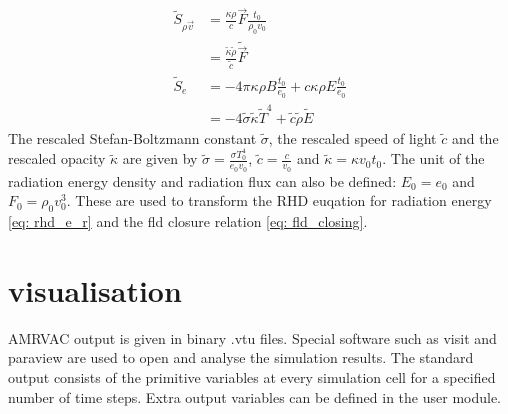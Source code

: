 \begin{align}
	\tilde{S}_{\rho \vec{v}} &=  \frac{\kappa \rho}{c} \vec{F} \frac{t_0}{\rho_0 v_0} \\
							 &=  \frac{\tilde{\kappa}\tilde{\rho}}{\tilde{c}} \tilde{\vec{F}} \\
	\tilde{S}_e &= -4\pi \kappa\rho B \frac{t_0}{e_0}  + c \kappa \rho E \frac{t_0}{e_0} \\
				&= -4 \tilde{\sigma} \tilde{\kappa} \tilde{T}^4 + \tilde{c} \tilde{\rho} \tilde{E}
\end{align}
The rescaled Stefan-Boltzmann constant $\tilde{\sigma}$, the rescaled speed of light $\tilde{c}$ and the rescaled opacity $\tilde{\kappa}$ are given by $\tilde{\sigma} = \frac{\sigma T_0^4}{e_0 v_0}$, $\tilde{c} = \frac{c}{v_0}$ and $\tilde{\kappa} = \kappa v_0 t_0$. The unit of the radiation energy density and radiation flux can also be defined: $E_0 = e_0$ and $F_0 = \rho_0 v_0^3$. These are used to transform the RHD euqation for radiation energy \eqref{eq: rhd_e_r} and the fld closure relation \eqref{eq: fld_closing}. 

\section{visualisation}
AMRVAC output is given in binary .vtu files. Special software such as visit \cite{} and paraview are used to open and analyse the simulation results. The standard output consists of the primitive variables at every simulation cell for a specified number of time steps. Extra output variables can be defined in the user module.

